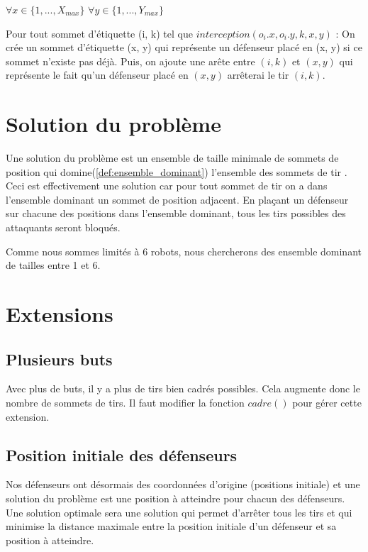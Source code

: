 $\forall x \in \{1, ..., X_{max}\}$ $\forall y \in \{1, ..., Y_{max}\}$ 

Pour tout sommet d'étiquette (i, k) tel que $interception(o_i.x, o_i.y, k, x, y)$ : On crée un sommet d'étiquette (x, y) qui représente un défenseur placé en (x, y) si ce sommet n'existe pas déjà. Puis, on ajoute une arête entre $(i, k)$ et $(x, y)$ qui représente le fait qu'un défenseur placé en $(x, y)$ arrêterai le tir $(i, k)$.

\section{Solution du problème}
Une solution du problème est un ensemble de taille minimale de sommets de position qui domine(\ref{def:ensemble_dominant}) l'ensemble des sommets de tir . Ceci est effectivement une solution car pour tout sommet de tir on a dans l'ensemble dominant un sommet de position adjacent. En plaçant un défenseur sur chacune des positions dans l'ensemble dominant, tous les tirs possibles des attaquants seront bloqués.

Comme nous sommes limités à 6 robots, nous chercherons des ensemble dominant de tailles entre 1 et 6.

\section{Extensions}
\subsection{Plusieurs buts}
Avec plus de buts, il y a plus de tirs bien cadrés possibles. Cela augmente donc le nombre de sommets de tirs. Il faut modifier la fonction $cadre()$ pour gérer cette extension.

\subsection{Position initiale des défenseurs}

Nos défenseurs ont désormais des coordonnées d'origine (positions initiale) et une solution du problème est une position à atteindre pour chacun des défenseurs. Une solution optimale sera une solution qui permet d'arrêter tous les tirs et qui minimise la distance maximale entre la position initiale d'un défenseur et sa position à atteindre.

